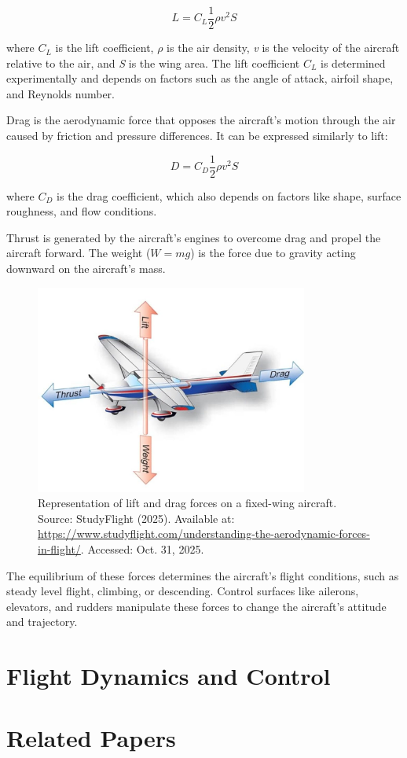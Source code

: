 \begin{equation}
    L = C_L \frac{1}{2} \rho v^2 S
\end{equation}

where $C_L$ is the lift coefficient, \textit{$\rho$} is the air density, \textit{v} is the velocity of the aircraft relative to the air, and \textit{S} is the wing area. The lift coefficient $C_L$ is determined experimentally and depends on factors such as the angle of attack, airfoil shape, and Reynolds number.

Drag is the aerodynamic force that opposes the aircraft's motion through the air caused by friction and pressure differences. It can be expressed similarly to lift:

\begin{equation}
    D = C_D \frac{1}{2} \rho v^2 S
\end{equation}

where $C_D$ is the drag coefficient, which also depends on factors like shape, surface roughness, and flow conditions.

Thrust is generated by the aircraft's engines to overcome drag and propel the aircraft forward. The weight ($W = mg$) is the force due to gravity acting downward on the aircraft's mass.

\begin{figure}[H]
    \centering
    \includegraphics[width=0.8\textwidth]{figures/forces.jpg}
    \caption{Representation of lift and drag forces on a fixed-wing aircraft. \\ Source: StudyFlight (2025). Available at: \url{https://www.studyflight.com/understanding-the-aerodynamic-forces-in-flight/}. Accessed: Oct. 31, 2025.}
\end{figure}


The equilibrium of these forces determines the aircraft's flight conditions, such as steady level flight, climbing, or descending. Control surfaces like ailerons, elevators, and rudders manipulate these forces to change the aircraft's attitude and trajectory.

\section{Flight Dynamics and Control}


\section{Related Papers}